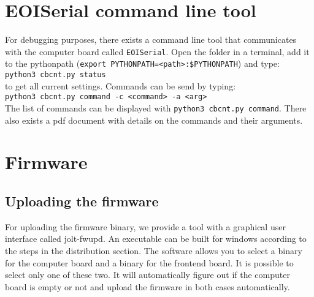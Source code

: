 \documentclass[]{article}
\begin{document}
\section{EOISerial command line tool}
For debugging purposes, there exists a command line tool that communicates with the computer board called \texttt{EOISerial}. Open the folder in a terminal, add it to the pythonpath (\texttt{export PYTHONPATH=<path>:\$PYTHONPATH}) and type:\\
\texttt{python3 cbcnt.py status}\\
to get all current settings. Commands can be send by typing:\\
\texttt{python3 cbcnt.py command -c <command> -a <arg>}\\
The list of commands can be displayed with \texttt{python3 cbcnt.py command}.
There also exists a pdf document with details on the commands and their arguments.

\section{Firmware}

\subsection{Uploading the firmware}
For uploading the firmware binary, we provide a tool with a graphical user interface called jolt-fwupd. An executable can be built for windows according to the steps in the distribution section. The software allows you to select a binary for the computer board and a binary for the frontend board. It is possible to select only one of these two. It will automatically figure out if the computer board is empty or not and upload the firmware in both cases automatically.
\end{document}
